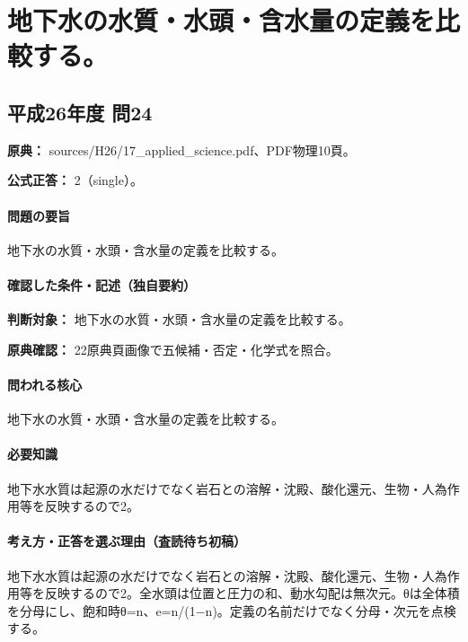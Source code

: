 \section{地下水の水質・水頭・含水量の定義を比較する。}

\subsection{平成26年度 問24}
\label{q:h26-reg-applied-24}

\noindent\textbf{原典：} sources/H26/17\_applied\_science.pdf、PDF物理10頁。

\textbf{公式正答：} 2（single）。

\paragraph{問題の要旨} 地下水の水質・水頭・含水量の定義を比較する。

\paragraph{確認した条件・記述（独自要約）}\mbox{}\par

\noindent\textbf{判断対象：} 地下水の水質・水頭・含水量の定義を比較する。\par

\noindent\textbf{原典確認：} 22原典頁画像で五候補・否定・化学式を照合。\par

\paragraph{問われる核心} 地下水の水質・水頭・含水量の定義を比較する。

\paragraph{必要知識} 地下水水質は起源の水だけでなく岩石との溶解・沈殿、酸化還元、生物・人為作用等を反映するので2。

\paragraph{考え方・正答を選ぶ理由（査読待ち初稿）} 地下水水質は起源の水だけでなく岩石との溶解・沈殿、酸化還元、生物・人為作用等を反映するので2。全水頭は位置と圧力の和、動水勾配は無次元。θは全体積を分母にし、飽和時θ=n、e=\allowbreak{}n/(1−n)。定義の名前だけでなく分母・次元を点検する。

